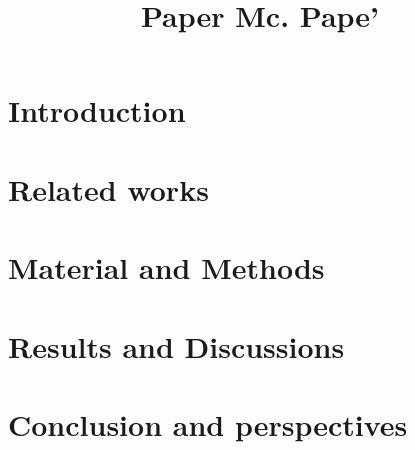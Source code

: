 \documentclass[10pt, a4]{article}
\begin{document}
\newcommand\tim[2]{{\color{red}#1}{\vphantom{#2}}}
\newcommand\alien[2]{{\color{blue}#1}{\vphantom{#2}}}

\title{Paper Mc. Pape'}

\author{}

\maketitle

\begin{abstract}

\end{abstract}

\section{Introduction}

\section{Related works}

\section{Material and Methods}

\section{Results and Discussions}


\section{Conclusion and perspectives}


{\small



}
\end{document}

